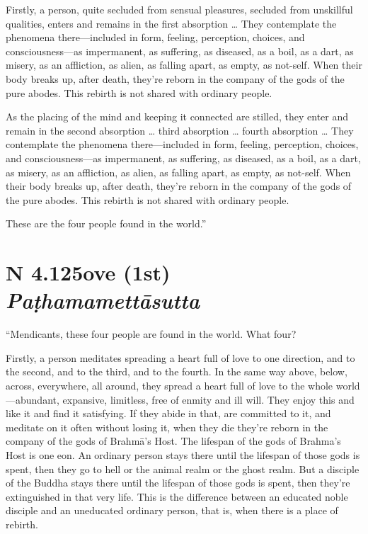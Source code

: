 \documentclass[12pt,openany]{book}%
\newcommand*{\suttatitleacronym}[1]{\smaller[2]{#1}\vspace*{.3em}}
\newcommand*{\suttatitletranslation}[1]{\linebreak{#1}}
\newcommand*{\suttatitleroot}[1]{\linebreak\smaller[2]\itshape{#1}}
\newcommand*{\tocacronym}[1]{\hspace*{-3.3em}{#1}\quad}
\newcommand*{\toctranslation}[1]{#1}
\newcommand*{\tocroot}[1]{(\textit{#1})}
\begin{document}
Firstly, a person, quite secluded from sensual pleasures, secluded from unskillful qualities, enters and remains in the first absorption … They contemplate the phenomena there—included in form, feeling, perception, choices, and consciousness—as impermanent, as suffering, as diseased, as a boil, as a dart, as misery, as an affliction, as alien, as falling apart, as empty, as not-self. When their body breaks up, after death, they’re reborn in the company of the gods of the pure abodes. This rebirth is not shared with ordinary people. 

As the placing of the mind and keeping it connected are stilled, they enter and remain in the second absorption … third absorption … fourth absorption … They contemplate the phenomena there—included in form, feeling, perception, choices, and consciousness—as impermanent, as suffering, as diseased, as a boil, as a dart, as misery, as an affliction, as alien, as falling apart, as empty, as not-self. When their body breaks up, after death, they’re reborn in the company of the gods of the pure abodes. This rebirth is not shared with ordinary people. 

These are the four people found in the world.” 

%
\section*{{\suttatitleacronym AN 4.125}{\suttatitletranslation Love (1st) }{\suttatitleroot Paṭhamamettāsutta}}
\addcontentsline{toc}{section}{\tocacronym{AN 4.125} \toctranslation{Love (1st) } \tocroot{Paṭhamamettāsutta}}

“Mendicants, these four people are found in the world. What four? 

Firstly, a person meditates spreading a heart full of love to one direction, and to the second, and to the third, and to the fourth. In the same way above, below, across, everywhere, all around, they spread a heart full of love to the whole world—abundant, expansive, limitless, free of enmity and ill will. They enjoy this and like it and find it satisfying. If they abide in that, are committed to it, and meditate on it often without losing it, when they die they’re reborn in the company of the gods of \textsanskrit{Brahmā}’s Host. The lifespan of the gods of Brahma’s Host is one eon. An ordinary person stays there until the lifespan of those gods is spent, then they go to hell or the animal realm or the ghost realm. But a disciple of the Buddha stays there until the lifespan of those gods is spent, then they’re extinguished in that very life. This is the difference between an educated noble disciple and an uneducated ordinary person, that is, when there is a place of rebirth. 
\end{document}
